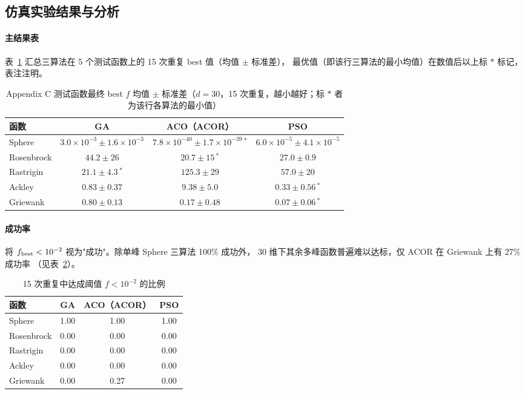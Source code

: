 \documentclass[12pt,a4paper,fontset=windows]{ctexart}
\begin{document}
\subsection{仿真实验结果与分析}

\paragraph{主结果表}
表~\ref{tab:func_main} 汇总三算法在 5 个测试函数上的 15 次重复 best 值（均值 $\pm$ 标准差），
最优值（即该行三算法的最小均值）在数值后以上标 $\ast$ 标记，表注注明。

\begin{table}[H]
  \centering
  \caption{Appendix C 测试函数最终 best $f$ 均值 $\pm$ 标准差（$d=30$，15 次重复，越小越好；标 $\ast$ 者为该行各算法的最小值）}
  \label{tab:func_main}
  \small
  \begin{tabular}{lccc}
    \toprule
    函数 & GA & ACO（ACOR） & PSO \\
    \midrule
    Sphere     & $3.0\times 10^{-3} \pm 1.6\times 10^{-3}$
               & $7.8\times 10^{-40} \pm 1.7\times 10^{-39}\,^{\ast}$
               & $6.0\times 10^{-5} \pm 4.1\times 10^{-5}$ \\
    Rosenbrock & $44.2 \pm 26$
               & $20.7 \pm 15\,^{\ast}$
               & $27.0 \pm 0.9$ \\
    Rastrigin  & $21.1 \pm 4.3\,^{\ast}$
               & $125.3 \pm 29$
               & $57.0 \pm 20$ \\
    Ackley     & $0.83 \pm 0.37$
               & $9.38 \pm 5.0$
               & $0.33 \pm 0.56\,^{\ast}$ \\
    Griewank   & $0.80 \pm 0.13$
               & $0.17 \pm 0.48$
               & $0.07 \pm 0.06\,^{\ast}$ \\
    \bottomrule
  \end{tabular}
\end{table}

\paragraph{成功率}
将 $f_{\rm best}<10^{-2}$ 视为"成功"。除单峰 Sphere 三算法 100\% 成功外，
30 维下其余多峰函数普遍难以达标，仅 ACOR 在 Griewank 上有 27\% 成功率
（见表~\ref{tab:func_succ}）。

\begin{table}[H]
  \centering
  \caption{15 次重复中达成阈值 $f<10^{-2}$ 的比例}
  \label{tab:func_succ}
  \small
  \begin{tabular}{lccc}
    \toprule
    函数 & GA & ACO（ACOR） & PSO \\
    \midrule
    Sphere     & 1.00 & 1.00 & 1.00 \\
    Rosenbrock & 0.00 & 0.00 & 0.00 \\
    Rastrigin  & 0.00 & 0.00 & 0.00 \\
    Ackley     & 0.00 & 0.00 & 0.00 \\
    Griewank   & 0.00 & 0.27 & 0.00 \\
    \bottomrule
  \end{tabular}
\end{table}
\end{document}
